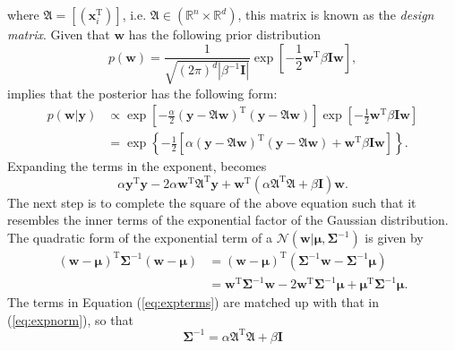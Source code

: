 where $\boldsymbol{\mathfrak{A}}=\left[(\mathbf{x}_i^{\text{T}})\right]$, i.e. $\boldsymbol{\mathfrak{A}}\in(\mathbb{R}^{n}\times\mathbb{R}^d)$, this matrix is known as the \textit{design matrix}. Given that $\mathbf{w}$ has the following prior distribution
\begin{equation}\label{eq:wpriori}
    p(\mathbf{w})=\frac{1}{\sqrt{(2\pi)^{d}|\beta^{-1}\mathbf{I}|}}\exp\left[-\frac{1}{2}\mathbf{w}^{\text{T}}\beta\mathbf{I}\mathbf{w}\right],
\end{equation}
implies that the posterior has the following form:
\begin{align}
    p(\mathbf{w}|\mathbf{y})&\propto\exp\left[-\frac{\alpha}{2}(\mathbf{y}-\boldsymbol{\mathfrak{A}}\mathbf{w})^{\text{T}}(\mathbf{y}-\boldsymbol{\mathfrak{A}}\mathbf{w})\right]\exp\left[-\frac{1}{2}\mathbf{w}^{\text{T}}\beta\mathbf{I}\mathbf{w}\right]\\
&=\exp\left\{-\frac{1}{2}\left[\alpha(\mathbf{y}-\boldsymbol{\mathfrak{A}}\mathbf{w})^{\text{T}}(\mathbf{y}-\boldsymbol{\mathfrak{A}}\mathbf{w})+\mathbf{w}^{\text{T}}\beta\mathbf{I}\mathbf{w}\right]\right\}.
\end{align}
Expanding the terms in the exponent, becomes
\begin{equation}\label{eq:expterms}
    \alpha\mathbf{y}^{\text{T}}\mathbf{y}-2\alpha\mathbf{w}^{\text{T}}\boldsymbol{\mathfrak{A}}^{\text{T}}\mathbf{y}+\mathbf{w}^{\text{T}}(\alpha\boldsymbol{\mathfrak{A}}^{\text{T}}\boldsymbol{\mathfrak{A}}+\beta\mathbf{I})\mathbf{w}.
\end{equation}
The next step is to complete the square of the above equation such that it resembles the inner terms of the exponential factor of the Gaussian distribution. The quadratic form of the exponential term of a $\mathcal{N}(\mathbf{w}|\boldsymbol{\mu},\boldsymbol{\Sigma}^{-1})$ is given by
\begin{align}
    (\mathbf{w}-\boldsymbol{\mu})^{\text{T}}\boldsymbol{\Sigma}^{-1}(\mathbf{w}-\boldsymbol{\mu})&=(\mathbf{w}-\boldsymbol{\mu})^{\text{T}}(\boldsymbol{\Sigma}^{-1}\mathbf{w}-\boldsymbol{\Sigma}^{-1}\boldsymbol{\mu})\\
&=\mathbf{w}^{\text{T}}\boldsymbol{\Sigma}^{-1}\mathbf{w}-
2\mathbf{w}^{\text{T}}\boldsymbol{\Sigma}^{-1}\boldsymbol{\mu}+\boldsymbol{\mu}^{\text{T}}\boldsymbol{\Sigma}^{-1}\boldsymbol{\mu}.\label{eq:expnorm}
\end{align}
The terms in Equation (\ref{eq:expterms}) are matched up with that in (\ref{eq:expnorm}), so that
\begin{equation}\label{eq:sigmablrgauss}
    \boldsymbol{\Sigma}^{-1}=\alpha\boldsymbol{\mathfrak{A}}^{\text{T}}\boldsymbol{\mathfrak{A}}+\beta\mathbf{I}
\end{equation}
